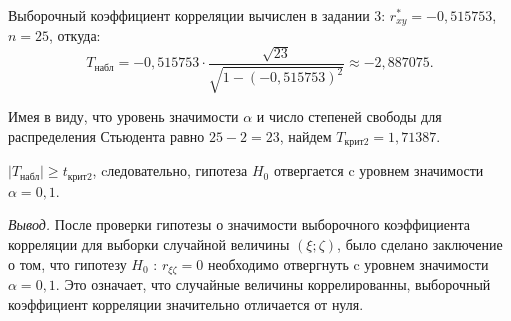 Выборочный коэффициент корреляции вычислен в задании 3: $r^*_{xy} = -0{,}515753$, 
$n = 25$, откуда:
$$
T_{\text{набл}} = 
-0{,}515753\cdot\dfrac{\sqrt{23}}{\sqrt{1 - (-0{,}515753)^2}} \approx
-2{,}887075.
$$

Имея в виду, что уровень значимости $\alpha$ и число степеней свободы для распределения Стьюдента равно $25-2=23$, найдем $T_{\text{крит}2} = 1{,}71387$.

 $|T_{\text{набл}}| \geqslant t_{\text{крит}2}$, cледовательно, гипотеза $H_0$ отвергается c уровнем значимости $\alpha = 0{,}1$.
 
\par
{\em Вывод.}
После проверки гипотезы о значимости выборочного коэффициента корреляции 
для выборки случайной величины $(\xi; \zeta)$, было сделано заключение о том, 
что гипотезу $H_0$ : $r_{\xi\zeta} = 0$ необходимо отвергнуть c уровнем 
значимости $\alpha = 0{,}1$. Это означает, что случайные величины 
коррелированны, выборочный коэффициент корреляции значительно 
отличается от нуля.






